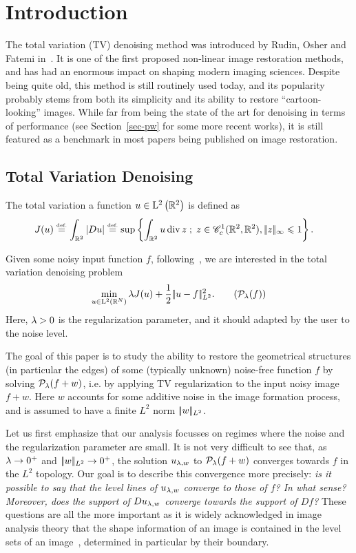
\section{Introduction}

The total variation (TV) denoising method was introduced by Rudin, Osher and Fatemi in~\cite{rudin1992nonlinear}. It is one of the first proposed non-linear image restoration methods, and has had an enormous impact on shaping modern imaging sciences. Despite being quite old, this method is still routinely used today, and its popularity probably stems from both its simplicity and its ability to restore ``cartoon-looking'' images. While  far from being the state of the art for denoising in terms of performance (see Section~\ref{sec-pw} for some more recent works), it is still featured as a benchmark in most papers being published on image restoration. 

\subsection{Total Variation Denoising}

The total variation a function $u \in \mathrm{L}^2\left(\mathbb{R}^2\right)$ is defined as 
\begin{align}
  J(u)&\stackrel{\mbox{\upshape\tiny def.}}{=} \int_{\mathbb{R}^2} \left| Du \right| 
  \stackrel{\mbox{\upshape\tiny def.}}{=} \sup \left\{ \int_{\mathbb{R}^2}u \operatorname{div} z  \;;\; z\in \mathscr{C}^{1}_c(\mathbb{R}^2,\mathbb{R}^2), |\!| z |\!|_{\infty}\leqslant 1  \right\}.
\end{align}

Given some noisy input function $f$, following~\cite{rudin1992nonlinear}, we are interested in the total variation denoising problem
\begin{equation}
  \min_{u\in \LDN} \la J(u)+ \frac{1}{2} \normLdeux{u-f}^2.
\tag{$\Pp_\la(f)$}\label{eq-rof}
\end{equation}
Here, $\lambda>0$ is the regularization parameter, and it should adapted by the user to the noise level. 
%

The goal of this paper is to study the ability to restore the geometrical structures (in particular the edges) of some (typically unknown) noise-free function $f$ by solving $\mathcal{P}_\lambda(f+w)$, i.e. by applying TV regularization to the input noisy image $f+w$. Here $w$ accounts for some additive noise in the image formation process, and is assumed to have a finite $L^2$ norm $|\!| w |\!|_{L^2}$. 


Let us first emphasize that our analysis focusses on regimes where the noise and the regularization parameter are small. It is not very difficult to see that, as $\lambda\to 0^+$ and $|\!| w |\!|_{L^2}\to 0^+$, the solution $u_{\lambda,w}$ to $\mathcal{P}_\lambda(f+w)$ converges towards $f$ in the $L^2$ topology. Our goal is to describe this convergence more precisely: \textit{is it possible to say that the level lines of $u_{\lambda,w}$ converge to those of $f$? In what sense? Moreover, does the support of $Du_{\lambda,w}$ converge towards the support of $Df$?}
These questions are all the more important as it is widely acknowledged in image analysis theory that the shape information of an image is contained in the level sets of an image~\cite{wertheimer1923,serra1982}, determined in particular by their boundary. 


